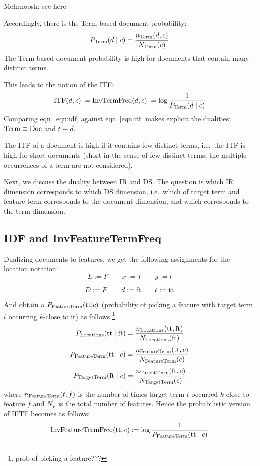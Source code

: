\hrulefill Mehrnoosh: see here

Accordingly, there is the Term-based document probability:
\[
P_{\textmd{Term}}(d\mid c) = \frac{n_{\textmd{Term}}(d,c)}{N_{\textmd{Term}}(c)} 
\]
The Term-based document probability is high for documents that contain
many distinct terms.

This leads to the notion of the ITF:
\begin{equation}
\label{eqn:itf}
\textmd{ITF}(d, c) :=
	\textmd{InvTermFreq}(d,c) := \log{\frac{1}{P_{\textmd{Term}}(d \mid c)}}
\end{equation}
Comparing eqn~\ref{eqn:idf} against eqn~\ref{eqn:itf} makes explicit the
dualities: $\textmd{Term}\equiv\textmd{Doc}$ and $t\equiv d$.

The ITF of a document is high if it contains few distinct terms, i.e.~the ITF
is high for short documents (short in the sense of few distinct terms,
the multiple occurrences of a term are not considered).

Next, we discuss the duality between IR and DS.
The question is which IR dimension corresponds to which DS dimension,
i.e.~which of target term and feature term corresponds to the document
dimension, and which corresponds to the term dimension.

\hrulefill

\subsection{IDF and InvFeatureTermFreq}

Dualizing documents to features,
we get the following assignments for the location notation:
\[
L := F \qquad
x := f\qquad
y := t
\]

\newcommand{\featureterm}{\textmd{ft}}
\newcommand{\targetterm}{\textmd{tt}}
\[
D := F \qquad
d := \featureterm\qquad
t := \targetterm
\]

And obtain a $P_{\textmd{FeatureTerm}}(\targetterm|c)$ (probability of picking a feature with target term $t$ occurring $k$-close to it) as follows
\footnote{prob of picking a feature???}
\[
P_{\textmd{Locations}}(\targetterm \mid \featureterm) = \frac{n_{\textmd{Locations}}(\targetterm,\featureterm)}{N_{\textmd{Locations}} (\featureterm)} 
\]
\[
P_{\textmd{FeatureTerm}}(\targetterm \mid c) = \frac{n_{\textmd{FeatureTerm}}(\targetterm,c)}{N_{\textmd{FeatureTerm}} (c)} 
\]
\[
P_{\textmd{TargetTerm}}(\featureterm \mid c) = \frac{n_{\textmd{TargetTerm}}(\featureterm,c)}{N_{\textmd{TargetTerm}} (c)} 
\]
where $n_{\textmd{FeatureTerm}}(t,f)$ is the number of times target term $t$ occurred $k$-close to feature $f$ and $N_F$ is the total number of features. Hence the probabilistic version of IFTF becomes as follows:
\begin{equation}
\label{eqn:iftf}
\textmd{InvFeatureTermFreq}(\targetterm, c) :=
	\log{\frac{1}{P_{\textmd{FeatureTerm}}(\targetterm \mid c)}}
\end{equation}

